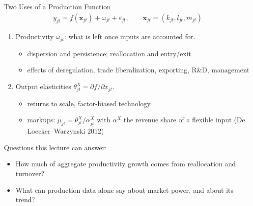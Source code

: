 \documentclass[aspectratio=169,10pt]{beamer}
\begin{document}
\begin{frame}{Two Uses of a Production Function}
\begin{align*}
y_{jt} = f(\mathbf{x}_{jt}) + \omega_{jt} + \varepsilon_{jt}, \qquad \mathbf{x}_{jt} = (k_{jt}, l_{jt}, m_{jt})
\end{align*}
\begin{enumerate}
\item \alert{Productivity} $\omega_{jt}$: what is left once inputs are accounted for.
\begin{itemize}
\item dispersion and persistence; reallocation and entry/exit
\item effects of deregulation, trade liberalization, exporting, R\&D, management
\end{itemize}
\item \alert{Output elasticities} $\theta^X_{jt} = \partial f / \partial x_{jt}$.
\begin{itemize}
\item returns to scale, factor-biased technology
\item \alert{markups}: $\mu_{jt} = \theta^X_{jt}/\alpha^X_{jt}$ with $\alpha^X$ the revenue share of a flexible input (De Loecker--Warzynski 2012)
\end{itemize}
\end{enumerate}
Questions this lecture can answer:
\begin{itemize}
\item How much of aggregate productivity growth comes from reallocation and turnover?
\item What can production data alone say about market power, and about its trend?
\end{itemize}
\end{frame}
\end{document}
